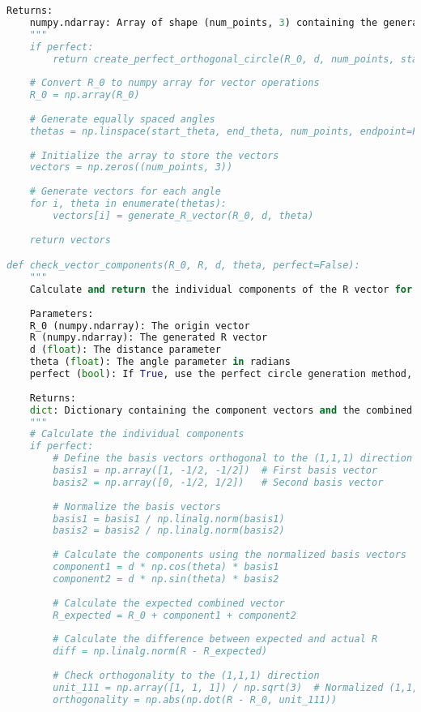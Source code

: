 \begin{lstlisting}[language=Python]
    Returns:
    numpy.ndarray: Array of shape (num_points, 3) containing the generated vectors
    """
    if perfect:
        return create_perfect_orthogonal_circle(R_0, d, num_points, start_theta, end_theta)
    
    # Convert R_0 to numpy array for vector operations
    R_0 = np.array(R_0)
    
    # Generate equally spaced angles
    thetas = np.linspace(start_theta, end_theta, num_points, endpoint=False)
    
    # Initialize the array to store the vectors
    vectors = np.zeros((num_points, 3))
    
    # Generate vectors for each angle
    for i, theta in enumerate(thetas):
        vectors[i] = generate_R_vector(R_0, d, theta)
    
    return vectors

def check_vector_components(R_0, R, d, theta, perfect=False):
    """
    Calculate and return the individual components of the R vector for verification
    
    Parameters:
    R_0 (numpy.ndarray): The origin vector
    R (numpy.ndarray): The generated R vector
    d (float): The distance parameter
    theta (float): The angle parameter in radians
    perfect (bool): If True, use the perfect circle generation method, default is False
    
    Returns:
    dict: Dictionary containing the component vectors and the combined vector
    """
    # Calculate the individual components
    if perfect:
        # Define the basis vectors orthogonal to the (1,1,1) direction
        basis1 = np.array([1, -1/2, -1/2])  # First basis vector
        basis2 = np.array([0, -1/2, 1/2])   # Second basis vector
        
        # Normalize the basis vectors
        basis1 = basis1 / np.linalg.norm(basis1)
        basis2 = basis2 / np.linalg.norm(basis2)
        
        # Calculate the components using the normalized basis vectors
        component1 = d * np.cos(theta) * basis1
        component2 = d * np.sin(theta) * basis2
        
        # Calculate the expected combined vector
        R_expected = R_0 + component1 + component2
        
        # Calculate the difference between expected and actual R
        diff = np.linalg.norm(R - R_expected)
        
        # Check orthogonality to the (1,1,1) direction
        unit_111 = np.array([1, 1, 1]) / np.sqrt(3)  # Normalized (1,1,1) vector
        orthogonality = np.abs(np.dot(R - R_0, unit_111))
        

\end{lstlisting}
